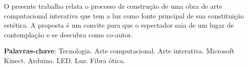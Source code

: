 \begin{RESUMO}
\thispagestyle{empty}
	\begin{SingleSpace}
	
		\hspace{-1.3 cm}O presente trabalho relata o processo de construção de uma obra de arte computacional interativa que tem a luz como fonte principal de sua constituição estética. A proposta é um convite para que o espectador saia de um lugar de contemplação e se descubra como co-autor.   
		
		\vspace*{0.5cm}\hspace{-1.3 cm}\textbf{Palavras-chave}: Tecnologia. Arte computacional. Arte interativa. Microsoft Kinect. Arduino. LED. Luz. Fibra ótica.
		
	\end{SingleSpace}
\end{RESUMO}


